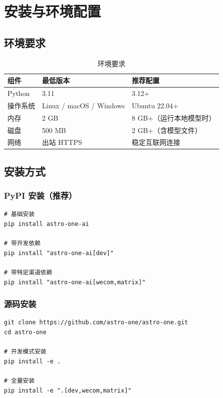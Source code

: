 \documentclass[12pt,a4paper,UTF8]{ctexart}
\begin{document}
\chapter{安装与环境配置}

\section{环境要求}

\begin{table}[H]
\centering
\begin{tabular}{L{4cm} L{5cm} L{6cm}}
\toprule
\textbf{组件} & \textbf{最低版本} & \textbf{推荐配置} \\
\midrule
Python & 3.11 & 3.12+ \\
操作系统 & Linux / macOS / Windows & Ubuntu 22.04+ \\
内存 & 2 GB & 8 GB+（运行本地模型时） \\
磁盘 & 500 MB & 2 GB+（含模型文件） \\
网络 & 出站 HTTPS & 稳定互联网连接 \\
\bottomrule
\end{tabular}
\caption{环境要求}
\end{table}

\section{安装方式}

\subsection{PyPI 安装（推荐）}

\begin{verbatim}
# 基础安装
pip install astro-one-ai

# 带开发依赖
pip install "astro-one-ai[dev]"

# 带特定渠道依赖
pip install "astro-one-ai[wecom,matrix]"
\end{verbatim}

\subsection{源码安装}

\begin{verbatim}
git clone https://github.com/astro-one/astro-one.git
cd astro-one

# 开发模式安装
pip install -e .

# 全量安装
pip install -e ".[dev,wecom,matrix]"
\end{verbatim}
\end{document}
